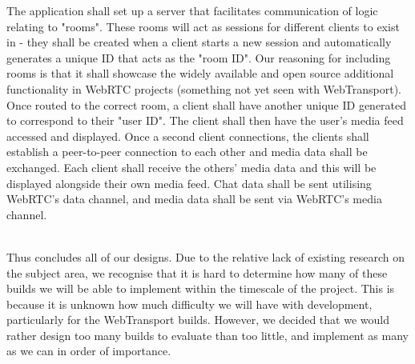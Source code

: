 The application shall set up a server that facilitates communication of logic relating to "rooms". These rooms will act as sessions for different clients to exist in - they shall be created when a client starts a new session and automatically generates a unique ID that acts as the "room ID". Our reasoning for including rooms is that it shall showcase the widely available and open source additional functionality in WebRTC projects (something not yet seen with WebTransport). Once routed to the correct room, a client shall have another unique ID generated to correspond to their "user ID". The client shall then have the user's media feed accessed and displayed. Once a second client connections, the clients shall establish a peer-to-peer connection to each other and media data shall be exchanged. Each client shall receive the others' media data and this will be displayed alongside their own media feed. Chat data shall be sent utilising WebRTC's data channel, and media data shall be sent via WebRTC's media channel.

\hfill{} \\
Thus concludes all of our designs. Due to the relative lack of existing research on the subject area, we recognise that it is hard to determine how many of these builds we will be able to implement within the timescale of the project. This is because it is unknown how much difficulty we will have with development, particularly for the WebTransport builds. However, we decided that we would rather design too many builds to evaluate than too little, and implement as many as we can in order of importance.




